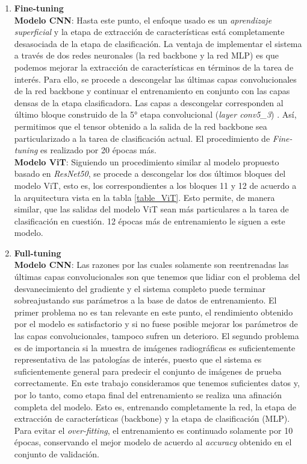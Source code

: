 \begin{enumerate}
    \item \textbf{Fine-tuning}\\
        \textbf{Modelo CNN}: Hasta este punto, el enfoque usado es un \textit{aprendizaje superficial} y la
        etapa de extracción de características está completamente desasociada de la etapa de clasificación. La
        ventaja de implementar el sistema a través de dos redes neuronales (la red backbone y la red MLP) es que
        podemos mejorar la extracción de características en términos de la tarea de interés. Para ello, se procede
        a descongelar las últimas capas convolucionales de la red backbone y continuar el entrenamiento en conjunto
        con las capas densas de la etapa clasificadora. Las capas a descongelar corresponden al último bloque
        construido de la 5° etapa convolucional (\textit{layer conv5\_3}) \cite{he2016deep}. Así, permitimos que el
        tensor obtenido a la salida de la red backbone sea particularizado a la tarea de clasificación actual. El
        procedimiento de \textit{Fine-tuning} es realizado por 20 épocas más.\\

        \textbf{Modelo ViT}: Siguiendo un procedimiento similar al modelo propuesto basado en \textit{ResNet50}, se
        procede a descongelar los dos últimos bloques del modelo ViT, esto es, los correspondientes a los bloques 11
        y 12 de acuerdo a la arquitectura vista en la tabla \ref{table_ViT}. Esto permite, de manera similar, que las
        salidas del modelo ViT sean más particulares a la tarea de clasificación en cuestión. 12 épocas más de
        entrenamiento le siguen a este modelo.


    \item \textbf{Full-tuning}\\
        \textbf{Modelo CNN}: Las razones por las cuales solamente son reentrenadas las últimas capas
        convolucionales son que tenemos que lidiar con el problema del desvanecimiento del gradiente y el sistema
        completo puede terminar sobreajustando sus parámetros a la base de datos de entrenamiento. El primer
        problema no es tan relevante en este punto, el rendimiento obtenido por el modelo es satisfactorio y si no
        fuese posible mejorar los parámetros de las capas convolucionales, tampoco sufren un deterioro. El segundo
        problema es de importancia si la muestra de imágenes radiográficas es suficientemente representativa de las
        patologías de interés, puesto que el sistema es suficientemente general para predecir el conjunto de imágenes
        de prueba correctamente. En este trabajo consideramos que tenemos suficientes datos y, por lo tanto, como
        etapa final del entrenamiento se realiza una afinación completa del modelo. Esto es, entrenando completamente
        la red, la etapa de extracción de características (backbone) y la etapa de clasificación (MLP). Para evitar
        el \textit{over-fitting}, el entrenamiento es continuado solamente por 10 épocas, conservando el mejor modelo
        de acuerdo al \textit{accuracy} obtenido en el conjunto de validación.\\


\end{enumerate}
